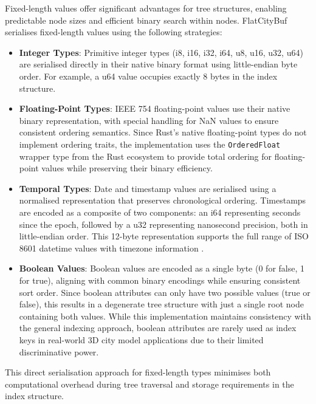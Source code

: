 Fixed-length values offer significant advantages for tree structures, enabling predictable node sizes and efficient binary search within nodes. FlatCityBuf serialises fixed-length values using the following strategies:

\begin{itemize}
  \item \textbf{Integer Types}: Primitive integer types (i8, i16, i32, i64, u8, u16, u32, u64) are serialised directly in their native binary format using little-endian byte order. For example, a u64 value occupies exactly 8 bytes in the index structure.

  \item \textbf{Floating-Point Types}: IEEE 754 floating-point values \citep{ieee_754_2023} use their native binary representation, with special handling for NaN values to ensure consistent ordering semantics. Since Rust's native floating-point types do not implement ordering traits, the implementation uses the \texttt{OrderedFloat} wrapper type from the Rust ecosystem to provide total ordering for floating-point values while preserving their binary efficiency.

  \item \textbf{Temporal Types}: Date and timestamp values are serialised using a normalised representation that preserves chronological ordering. Timestamps are encoded as a composite of two components: an i64 representing seconds since the epoch, followed by a u32 representing nanosecond precision, both in little-endian order. This 12-byte representation supports the full range of ISO 8601 datetime values with timezone information \citep{iso_8601_2023}.
  \item \textbf{Boolean Values}: Boolean values are encoded as a single byte (0 for false, 1 for true), aligning with common binary encodings while ensuring consistent sort order. Since boolean attributes can only have two possible values (true or false), this results in a degenerate tree structure with just a single root node containing both values. While this implementation maintains consistency with the general indexing approach, boolean attributes are rarely used as index keys in real-world 3D city model applications due to their limited discriminative power.
\end{itemize}

This direct serialisation approach for fixed-length types minimises both computational overhead during tree traversal and storage requirements in the index structure.

